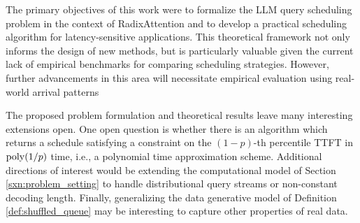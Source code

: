 The primary objectives of this work were to formalize the LLM query scheduling problem in the context of RadixAttention and to develop a practical scheduling algorithm for latency-sensitive applications. This theoretical framework not only informs the design of new methods, but is particularly valuable given the current lack of empirical benchmarks for comparing scheduling strategies. However, further advancements in this area will necessitate empirical evaluation using real-world arrival patterns

The proposed problem formulation and theoretical results leave many interesting extensions open. One open question is whether there is an algorithm which returns a schedule satisfying a constraint on the $(1-p)$-th percentile TTFT in $\operatorname{poly}(1/p)$ time, i.e., a polynomial time approximation scheme. Additional directions of interest would be extending the computational model of Section \ref{sxn:problem_setting} to handle distributional query streams or non-constant decoding length. Finally, generalizing the data generative model of Definition \ref{def:shuffled_queue} may be interesting to capture other properties of real data.






